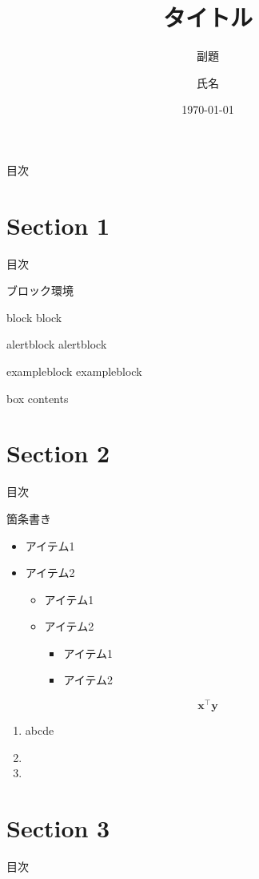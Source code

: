 \documentclass[dvipdfmx, 11pt]{beamer}
\title[Short title]{タイトル}
\subtitle{副題}
\author[著者略称]{氏名}
\institute[所属略称]{所属}
\date{\today}
\begin{document}
\maketitle

\begin{frame}{目次}
    \tableofcontents
\end{frame}

\section{Section 1}
\begin{frame}{目次}
    \tableofcontents[currentsection]
\end{frame}

\begin{frame}{ブロック環境}
    \begin{block}{block}
    block
    \end{block}
    \begin{alertblock}{alertblock}
    alertblock
    \end{alertblock}
    \begin{exampleblock}{exampleblock}
    exampleblock
    \end{exampleblock}
    \begin{tcolorbox}[colframe=green,
    colback=green!10!white,
    colbacktitle=green!40!white,
    coltitle=black, fonttitle=\bfseries,
    title=My box]
        box contents
    \end{tcolorbox}
\end{frame}

\section{Section 2}
\begin{frame}{目次}
    \tableofcontents[currentsection]
\end{frame}

\begin{frame}{箇条書き}
    \begin{itemize}
    \item アイテム1
    \item \alert{アイテム2}
        \begin{itemize}
        \item アイテム1
        \item \alert{アイテム2}
            \begin{itemize}
            \item アイテム1
            \item \alert{アイテム2}
            \end{itemize}
        \end{itemize}
    \end{itemize}
    \[
    \bm{x}^\top\bm{y}
    \]
    \begin{enumerate}
    \item abcde
    \item {}
    \item 
    \end{enumerate}
\end{frame}

\section{Section 3}
\begin{frame}{目次}
    \tableofcontents[currentsection]
\end{frame}
\end{document}
